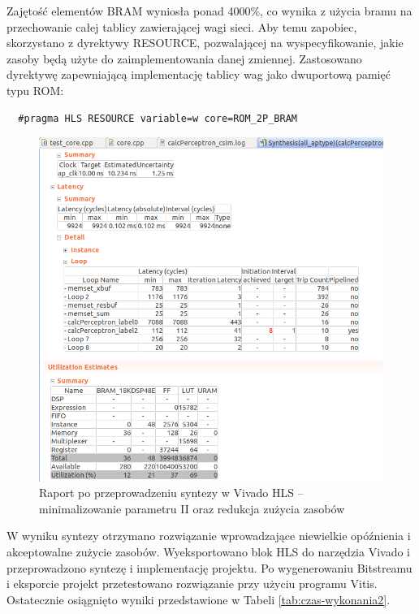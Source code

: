 Zajętość elementów BRAM wyniosła ponad 4000\%, co wynika z użycia bramu na przechowanie całej tablicy zawierającej wagi sieci. Aby temu zapobiec, skorzystano z dyrektywy RESOURCE, pozwalającej na wyspecyfikowanie, jakie zasoby będą użyte do zaimplementowania danej zmiennej. Zastosowano dyrektywę zapewniającą implementację tablicy wag jako dwuportową pamięć typu ROM:
\begin{verbatim}
  #pragma HLS RESOURCE variable=w core=ROM_2P_BRAM
\end{verbatim}


\begin{figure}[!h]
  \centering
  \includegraphics[width=\textwidth]{img/hls-report4.png}
  \caption{Raport po przeprowadzeniu syntezy w Vivado HLS -- minimalizowanie parametru II oraz redukcja zużycia zasobów}
  \label{hls-report4}
\end{figure}

W wyniku syntezy otrzymano rozwiązanie wprowadzające niewielkie opóźnienia i akceptowalne zużycie zasobów. Wyeksportowano blok HLS do narzędzia Vivado i przeprowadzono syntezę i implementację projektu. Po wygenerowaniu Bitstreamu i eksporcie projekt przetestowano rozwiązanie przy użyciu programu Vitis. Ostatecznie osiągnięto wyniki przedstawione w Tabeli \ref{tab:czas-wykonania2}.


